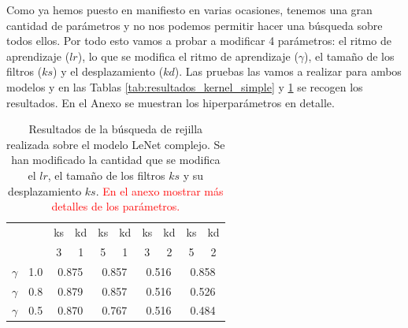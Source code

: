 \documentclass[a4paper,12pt,twoside,titlepage]{article}
\newcommand{\red}[1]{\textcolor{red}{#1}}
\begin{document}
Como ya hemos puesto en manifiesto en varias ocasiones, tenemos una gran cantidad de parámetros y no nos podemos permitir hacer una búsqueda sobre todos ellos. Por todo esto vamos a probar a modificar 4 parámetros: el ritmo de aprendizaje ($lr$), lo que se modifica el ritmo de aprendizaje ($\gamma$), el tamaño de los filtros ($ks$) y el desplazamiento ($kd$). Las pruebas las vamos a realizar para ambos modelos y en las Tablas \ref{tab:resultados_kernel_simple} y \ref{tab:resultados_kernel_complejo} se recogen los resultados. En el Anexo se muestran los hiperparámetros en detalle.


\begin{table}[h!]
  \centering
  \begin{tabular}{|cc||cc|cc|cc|cc|}
  \hline
  \multicolumn{2}{|c||}{\multirow{2}{*}{}} & \multicolumn{1}{c|}{ks} & kd & \multicolumn{1}{c|}{ks} & kd & \multicolumn{1}{c|}{ks} & kd & \multicolumn{1}{c|}{ks} & kd \\ \cline{3-10} 
  \multicolumn{2}{|c||}{}                  & \multicolumn{1}{c|}{3}  & 1  & \multicolumn{1}{c|}{5}  & 1  & \multicolumn{1}{c|}{3}  & 2  & \multicolumn{1}{c|}{5}  & 2  \\ \hline\hline
  \multicolumn{1}{|c|}{$\gamma$}   & 1.0  & \multicolumn{2}{c|}{0.875}   & \multicolumn{2}{c|}{0.857}   & \multicolumn{2}{c|}{0.516}   & \multicolumn{2}{c|}{0.858}   \\ \hline
  \multicolumn{1}{|c|}{$\gamma$}   & 0.8  & \multicolumn{2}{c|}{0.879}   & \multicolumn{2}{c|}{0.857}   & \multicolumn{2}{c|}{0.516}   & \multicolumn{2}{c|}{0.526}   \\ \hline
  \multicolumn{1}{|c|}{$\gamma$}   & 0.5  & \multicolumn{2}{c|}{0.870}   & \multicolumn{2}{c|}{0.767}   & \multicolumn{2}{c|}{0.516}   & \multicolumn{2}{c|}{0.484}   \\ \hline
  \end{tabular}
  \caption{Resultados de la búsqueda de rejilla realizada sobre el modelo  LeNet complejo. Se han modificado la cantidad que se modifica el $lr$, el tamaño de los filtros $ks$ y su desplazamiento $ks$. \red{En el anexo mostrar más detalles de los parámetros.}}
  \label{tab:resultados_kernel_complejo}
  \end{table}
\end{document}

